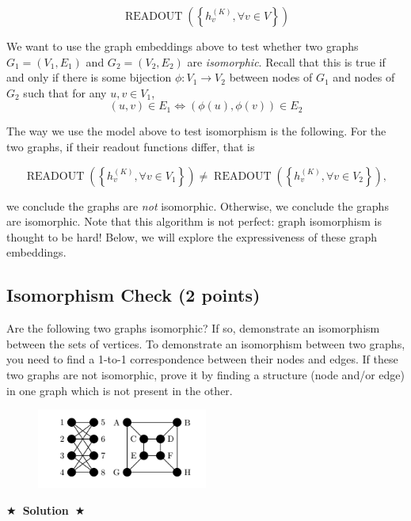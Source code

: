 \documentclass{article}
\numberwithin{figure}{section}
\newcommand{\Solution}[1]{{\medskip \color{red} \bf $\bigstar$~\sf \textbf{Solution}~$\bigstar$ \sf #1 } \bigskip}
\begin{document}
$$\operatorname { READOUT }\left(\left\{h_v^{(K)}, \forall v \in V\right\}\right)$$

We want to use the graph embeddings above to test whether two graphs $G_1 = (V_1, E_1)$ and $G_2 = (V_2, E_2)$ are \textit{isomorphic}.
Recall that this is true if and only if there is some bijection $\phi : V_1 \rightarrow V_2$ between nodes of $G_1$ and nodes of $G_2$ such that for any $u, v \in V_1$, 
$$(u, v) \in E_1 \Leftrightarrow (\phi(u), \phi(v)) \in E_2$$

The way we use the model above to test isomorphism is the following. For the two graphs, if their readout functions differ, that is 

$$\operatorname { READOUT }\left(\left\{h_v^{(K)}, \forall v \in V_1\right\}\right) \neq \operatorname { READOUT }\left(\left\{h_v^{(K)}, \forall v \in V_2\right\}\right),$$

we conclude the graphs are \textit{not} isomorphic. Otherwise, we conclude the graphs are isomorphic. Note that this algorithm is not perfect: graph isomorphism is thought to be hard! Below, we will explore the expressiveness of these graph embeddings. 

\subsection{Isomorphism Check (2 points)}
Are the following two graphs isomorphic? If so, demonstrate an isomorphism
between the sets of vertices. To demonstrate an isomorphism between two
graphs, you need to find a 1-to-1 correspondence between their nodes and edges.
If these two graphs are not isomorphic, prove it by finding a structure (node
and/or edge) in one graph which is not present in the other. 
    \begin{figure}[H]
        \centering
        \includegraphics[width=0.5\textwidth]{CS224W_Homework1/fig1.png}
        \label{fig:my_label2}
    \end{figure}

\Solution{}
\end{document}
